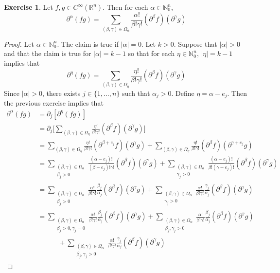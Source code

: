 \documentclass{book}
\theoremstyle{definition}
\newtheorem{ex}[definition]{Exercise}
\newcommand{\al}{\alpha}
\newcommand{\be}{\beta}
\newcommand{\gam}{\gamma}
\newcommand{\Om}{\Omega}
\newcommand{\N}{\mathbb{N}}
\newcommand{\R}{\mathbb{R}}
\DeclareMathOperator*{\0}{\mbf{0}}
\DeclareMathOperator*{\1}{\mbf{1}}
\newcommand{\p}{\partial}
\begin{document}
	\begin{ex}
		Let $f, g \in C^{\infty}(\R^n)$. Then for each $\al \in \N_0^n$, 
		$$\p^{\al}(fg) = \sum_{(\be, \gam) \in \Om_{\al}} \frac{\al!}{\be !\gam!}( \p^{\be} f) (\p^{\gam}g)$$  
	\end{ex}

	\begin{proof}
		Let $\al \in \N^n_0$. The claim is true if $|\al| = 0$. Let $k > 0$. Suppose that $|\al| > 0$ and that the claim is true for $|\al| = k - 1$ so that for each $\eta \in \N^n_0$, $|\eta| = k-1$ implies that 
		$$\p^{\eta}(fg) = \sum_{(\be, \gam) \in \Om_{\eta}} \frac{\eta!}{\be !\gam!}( \p^{\be} f) (\p^{\gam}g)$$ 
		Since $|\al| > 0$, there exists $j \in \{1, \ldots, n\}$ such that $\al_j > 0$. Define $\eta = \al - e_j$. Then the previous exercise implies that 
		\begin{align*}
			\p^{\al}(fg)
			&= \p_j [\p^{\eta}(fg)] \\
			&= \p_j \bigg[ \sum_{(\be, \gam) \in \Om_{\eta}} \frac{\eta!}{\be !\gam!}( \p^{\be} f) (\p^{\gam}g) \bigg] \\
			&= \sum_{(\be, \gam) \in \Om_{\eta}} \frac{\eta!}{\be !\gam!}(\p^{\be + e_j} f) (\p^{\gam}g) + \sum_{(\be, \gam) \in \Om_{\eta}} \frac{\eta!}{\be !\gam!} (\p^{\be} f) (\p^{\gam + e_j}g) \\
			&= \sum_{\substack{(\be, \gam) \in \Om_{\al} \\ \be_j > 0}} \frac{(\al - e_j)!}{(\be - e_j) !\gam!}(\p^{\be} f) (\p^{\gam}g) + \sum_{\substack{(\be, \gam) \in \Om_{\al} \\ \gam_j > 0}} \frac{(\al - e_j)!}{\be ! (\gam - e_j)!} (\p^{\be} f) (\p^{\gam}g) \\
			& = \sum_{\substack{(\be, \gam) \in \Om_{\al} \\ \be_j > 0}} \frac{\al!}{\be !\gam !} \frac{\be_j}{\al_j}(\p^{\be} f) (\p^{\gam}g) + \sum_{\substack{(\be, \gam) \in \Om_{\al} \\ \gam_j > 0}} \frac{\al!}{\be ! \gam !}\frac{\gam_j}{\al_j} (\p^{\be} f) (\p^{\gam}g) \\
			& = \sum_{\substack{(\be, \gam) \in \Om_{\al} \\ \be_j > 0, \gam_j = 0}} \frac{\al!}{\be !\gam !} \frac{\be_j}{\al_j}(\p^{\be} f) (\p^{\gam}g) 
			+ \sum_{\substack{(\be, \gam) \in \Om_{\al} \\ \be_j, \gam_j > 0}} \frac{\al!}{\be !\gam !} \frac{\be_j}{\al_j}(\p^{\be} f) (\p^{\gam}g) \\
			& \quad \quad \quad + \sum_{\substack{(\be, \gam) \in \Om_{\al} \\ \be_j, \gam_j > 0}} \frac{\al!}{\be ! \gam !}\frac{\gam_j}{\al_j} (\p^{\be} f) (\p^{\gam}g) 

\end{align*}
\end{proof}
\end{document}
